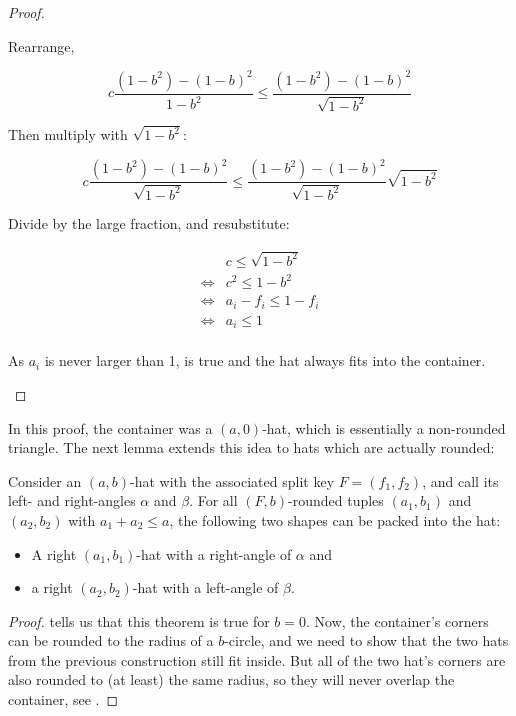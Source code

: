 \documentclass[a4paper,style=print,bibliography=totoc,nexus,lnum,extramargin]{tubsbook}
\begin{document}
\begin{proof}
\begin{itemize}
            Rearrange,

            $$c\frac{(1-b^2)-(1-b)^2}{1-b^2} \le \frac{(1-b^2)-(1-b)^2}{\sqrt{1-b^2}}$$

            Then multiply with $\sqrt{1-b^2}$:

            $$c\frac{(1-b^2)-(1-b)^2}{\sqrt{1-b^2}} \le \frac{(1-b^2)-(1-b)^2}{\sqrt{1-b^2}}\sqrt{1-b^2}$$

            Divide by the large fraction, and resubstitute:

            \begin{align*}
                &c \le \sqrt{1-b^2}\\
                \iff &c^2 \le 1-b^2\\
                \iff &a_i - f_i \le 1-f_i\\
                \iff &a_i \le 1\\
            \end{align*}

            As $a_i$ is never larger than 1,  is true and the hat always fits into the container.
    \end{itemize}
\end{proof}

In this proof, the container was a $(a,0)$-hat, which is essentially a non-rounded triangle. The next lemma extends this idea to hats which are actually rounded:

\begin{lemma}\label{th:rounded-hats-in-hat}
    Consider an $(a,b)$-hat with the associated split key $F = (f_1, f_2)$, and call its left- and right-angles $\alpha$ and $\beta$.
    For all $(F,b)$-rounded tuples $(a_1, b_1)$ and $(a_2, b_2)$ with $a_1 + a_2 \le a$, the following two shapes can be packed into the hat:
    \begin{itemize}
        \item A right $(a_1,b_1)$-hat with a right-angle of $\alpha$ and
        \item a right $(a_2,b_2)$-hat with a left-angle of $\beta$.
    \end{itemize}
\end{lemma}

\begin{proof}
     tells us that this theorem is true for $b = 0$. Now, the container's corners can be rounded to the radius of a $b$-circle, and we need to show that the two hats from the previous construction still fit inside. But all of the two hat's corners are also rounded to (at least) the same radius, so they will never overlap the container, see .
\end{proof}
\end{document}
